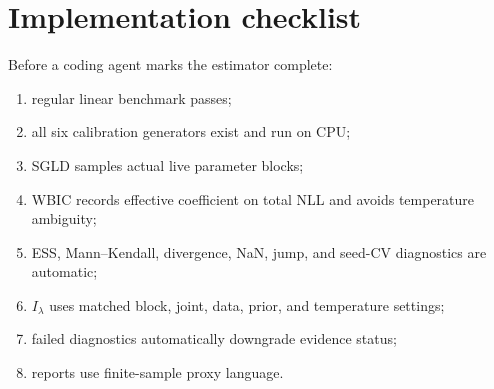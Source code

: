 \documentclass[11pt]{article}
\begin{document}
\section{Implementation checklist}

Before a coding agent marks the estimator complete:
\begin{enumerate}[(1)]
\item regular linear benchmark passes;
\item all six calibration generators exist and run on CPU;
\item SGLD samples actual live parameter blocks;
\item WBIC records effective coefficient on total NLL and avoids temperature ambiguity;
\item ESS, Mann--Kendall, divergence, NaN, jump, and seed-CV diagnostics are automatic;
\item $I_\lambda$ uses matched block, joint, data, prior, and temperature settings;
\item failed diagnostics automatically downgrade evidence status;
\item reports use finite-sample proxy language.
\end{enumerate}
\end{document}
